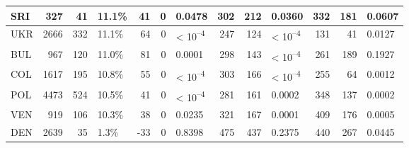 \begin{tabular}{l|r|r|l|r|r|l|r|r|l|r|r|l}
\hline
SRI & 327 & 41 & 11.1\% & 41 & 0 & 0.0478 & 302 & 212 & 0.0360 & 332 & 181 & 0.0607\\
\hline
UKR & 2666 & 332 & 11.1\% & 64 & 0 & < 10\textsuperscript{--4} & 247 & 124 & < 10\textsuperscript{--4} & 131 & 41 & 0.0127\\
\hline
BUL & 967 & 120 & 11.0\% & 81 & 0 & 0.0001 & 298 & 143 & < 10\textsuperscript{--4} & 261 & 189 & 0.1927\\
\hline
COL & 1617 & 195 & 10.8\% & 55 & 0 & < 10\textsuperscript{--4} & 303 & 166 & < 10\textsuperscript{--4} & 255 & 64 & 0.0012\\
\hline
POL & 4473 & 524 & 10.5\% & 41 & 0 & < 10\textsuperscript{--4} & 281 & 161 & 0.0002 & 348 & 137 & 0.0002\\
\hline
VEN & 919 & 106 & 10.3\% & 38 & 0 & 0.0235 & 321 & 167 & 0.0001 & 409 & 176 & 0.0005\\
\hline
DEN & 2639 & 35 & 1.3\% & -33 & 0 & 0.8398 & 475 & 437 & 0.2375 & 440 & 267 & 0.0445\\
\hline
\end{tabular}

